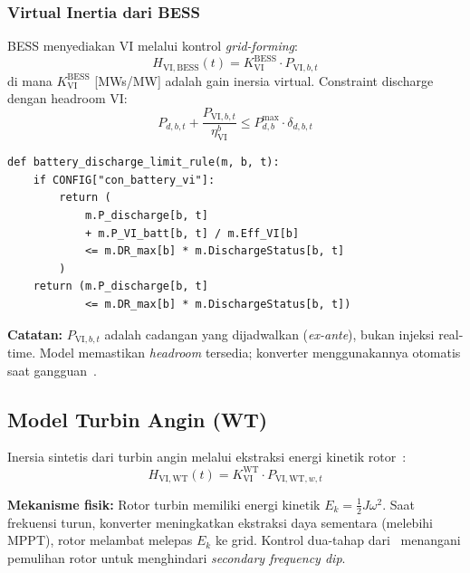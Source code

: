 \documentclass[journal]{IEEEtran}
\newcommand{\HVIBESS}{H_{\mathrm{VI,BESS}}}
\newcommand{\HVIWT}{H_{\mathrm{VI,WT}}}
\begin{document}
\subsubsection{Virtual Inertia dari BESS}

BESS menyediakan VI melalui kontrol \textit{grid-forming}:
\begin{equation}
  \HVIBESS(t) = K_{\mathrm{VI}}^{\mathrm{BESS}} \cdot P_{\mathrm{VI},b,t}
  \label{eq:h_bess_vi}
\end{equation}
di mana $K_{\mathrm{VI}}^{\mathrm{BESS}}$ [MWs/MW] adalah
gain inersia virtual. Constraint discharge dengan headroom VI:
\begin{equation}
  P_{d,b,t} + \frac{P_{\mathrm{VI},b,t}}{\eta_{\mathrm{VI}}^b}
    \leq P_{d,b}^{\max} \cdot \delta_{d,b,t}
  \label{eq:bess_dis_vi}
\end{equation}

\begin{lstlisting}[style=pycode,caption={Constraint discharge BESS dengan VI headroom (Cell 52)}]
def battery_discharge_limit_rule(m, b, t):
    if CONFIG["con_battery_vi"]:
        return (
            m.P_discharge[b, t]
            + m.P_VI_batt[b, t] / m.Eff_VI[b]
            <= m.DR_max[b] * m.DischargeStatus[b, t]
        )
    return (m.P_discharge[b, t]
            <= m.DR_max[b] * m.DischargeStatus[b, t])
\end{lstlisting}

\textbf{Catatan:} $P_{\mathrm{VI},b,t}$ adalah cadangan
yang dijadwalkan (\textit{ex-ante}), bukan injeksi real-time.
Model memastikan \textit{headroom} tersedia; konverter
menggunakannya otomatis saat gangguan~\cite{Wen2016}.

\subsection{Model Turbin Angin (WT)}

Inersia sintetis dari turbin angin melalui ekstraksi energi
kinetik rotor~\cite{Chu2020}:
\begin{equation}
  \HVIWT(t) = K_{\mathrm{VI}}^{\mathrm{WT}} \cdot P_{\mathrm{VI,WT},w,t}
  \label{eq:h_wt_vi}
\end{equation}

\textbf{Mekanisme fisik:} Rotor turbin memiliki energi
kinetik $E_k = \frac{1}{2}J\omega^2$. Saat frekuensi turun,
konverter meningkatkan ekstraksi daya sementara (melebihi
MPPT), rotor melambat melepas $E_k$ ke grid. Kontrol
dua-tahap dari~\cite{Chu2020} menangani pemulihan rotor
untuk menghindari \textit{secondary frequency dip}.
\end{document}
